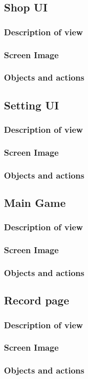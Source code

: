 \documentclass[11pt]{article}
\begin{document}
\subsection{Shop UI}
\subsubsection{Description of view}
\subsubsection{Screen Image}
\subsubsection{Objects and actions}

\subsection{Setting UI}
\subsubsection{Description of view}
\subsubsection{Screen Image}
\subsubsection{Objects and actions}

\subsection{Main Game}
\subsubsection{Description of view}
\subsubsection{Screen Image}
\subsubsection{Objects and actions}

\subsection{Record page}
\subsubsection{Description of view}
\subsubsection{Screen Image}
\subsubsection{Objects and actions}
\end{document}
